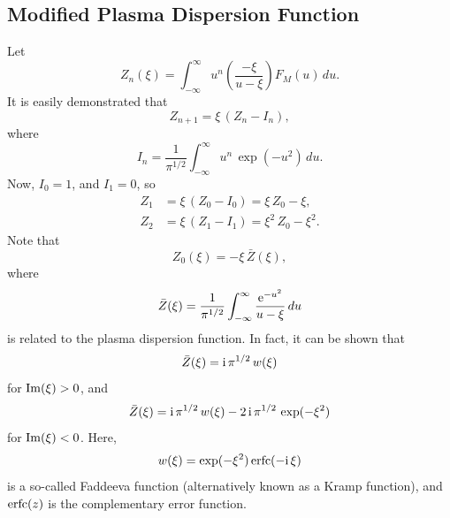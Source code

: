\documentclass[12pt,prb,aps]{revtex4-1}
\begin{document}
\subsection{Modified Plasma Dispersion Function}
Let
\begin{equation}\label{e44}
Z_n(\xi)= \int_{-\infty}^\infty u^n\left(\frac{-\xi}{u-\xi}\right)F_M(u)\,du.
\end{equation}
It is easily demonstrated that 
\begin{equation}
Z_{n+1}= \xi\,(Z_n-I_{n}),
\end{equation}
where
\begin{equation}
I_n = \frac{1}{\pi^{1/2}}\int_{-\infty}^\infty u^n\,\exp(-u^2)\,du.
\end{equation}
Now, $I_0=1$, and $I_1=0$, so
\begin{align}\label{ez1}
Z_1 &= \xi\,(Z_0-I_0) = \xi\,Z_0-\xi,\\[0.5ex]
Z_2&= \xi\,(Z_1-I_1) =  \xi^2\,Z_0-\xi^2.\label{ez2}
\end{align}
Note that 
\begin{equation}\label{z0}
Z_0(\xi)= -\xi\,\bar{Z}(\xi),
\end{equation}
where
\begin{equation}\label{z1}
\bar{Z}(\xi) = \frac{1}{\pi^{1/2}}\int_{-\infty}^\infty \frac{{\rm e}^{-u^2}}{u-\xi}\,du
\end{equation}
is related to the plasma dispersion function.\cite{rf0,fc}
In fact, it can be shown that\,\cite{rf0}
\begin{equation}
\bar{Z}(\xi)= {\rm i}\,\pi^{1/2}\,w(\xi)
\end{equation}
for ${\rm Im}(\xi)>0$, and 
\begin{equation}
\bar{Z}(\xi)={\rm i}\,\pi^{1/2}\,w(\xi)-2\,{\rm i}\,\pi^{1/2}\,\exp(-\xi^2) 
\end{equation}
for ${\rm Im}(\xi)<0$.
Here,
\begin{equation}
w(\xi)= \exp(-\xi^2)\,{\rm erfc}(-{\rm i}\,\xi)
\end{equation}
is a so-called Faddeeva function (alternatively known as a Kramp function),\cite{as} and 
${\rm erfc}(z)$ is the complementary error function.\cite{as} 
\end{document}

